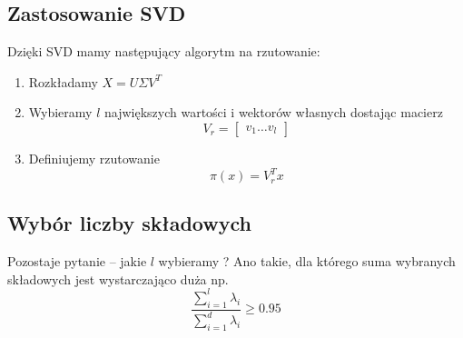 \subsection{Zastosowanie SVD}
Dzięki SVD mamy następujący algorytm na rzutowanie:
\begin{enumerate}
    \item Rozkładamy \( X = U\Sigma V^T \)
    \item Wybieramy \( l \) największych wartości i wektorów własnych dostając macierz
    \[
         V_r = \begin{bmatrix}
            v_1 \dots v_l
            \end{bmatrix}
    \]
    \item Definiujemy rzutowanie
    \[
        \pi(x) = V_r^T x
        \]
\end{enumerate}

\subsection{Wybór liczby składowych}

Pozostaje pytanie -- jakie \( l \) wybieramy ?
Ano takie, dla którego suma wybranych składowych jest wystarczająco duża np.
\[
    \frac{\sum_{i=1}^l \lambda_i}{\sum_{i=1}^d \lambda_i} \geq 0.95
\]